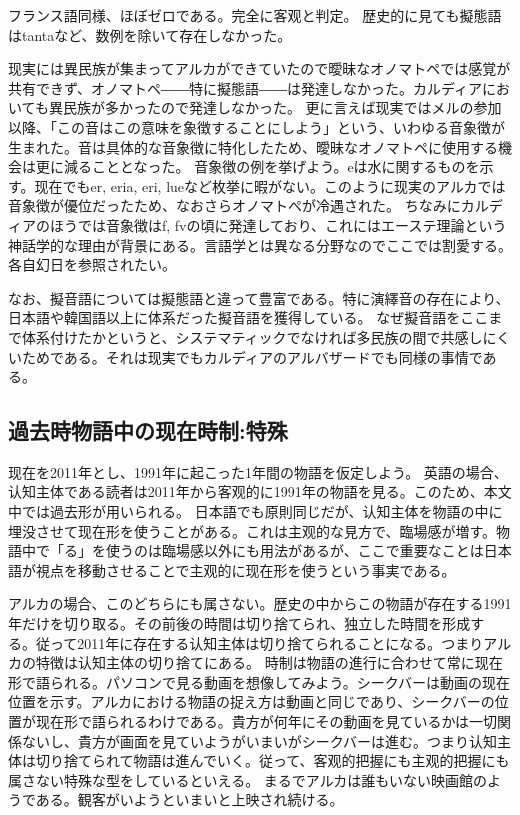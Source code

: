 フランス語同様、ほぼゼロである。完全に客观と判定。
歴史的に見ても擬態語はtantaなど、数例を除いて存在しなかった。

现実には異民族が集まってアルカができていたので曖昧なオノマトペでは感覚が共有できず、オノマトペ――特に擬態語――は発達しなかった。カルディアにおいても異民族が多かったので発達しなかった。
更に言えば现実ではメルの参加以降、「この音はこの意味を象徴することにしよう」という、いわゆる音象徴が生まれた。音は具体的な音象徴に特化したため、曖昧なオノマトペに使用する機会は更に減ることとなった。
音象徴の例を挙げよう。eは水に関するものを示す。现在でもer, eria, eri, lueなど枚挙に暇がない。このように现実のアルカでは音象徴が優位だったため、なおさらオノマトペが冷遇された。
ちなみにカルディアのほうでは音象徴はf, fvの頃に発達しており、これにはエーステ理論という神話学的な理由が背景にある。言語学とは異なる分野なのでここでは割愛する。各自幻日を参照されたい。

なお、擬音語については擬態語と違って豊富である。特に演繹音の存在により、日本語や韓国語以上に体系だった擬音語を獲得している。
なぜ擬音語をここまで体系付けたかというと、システマティックでなければ多民族の間で共感しにくいためである。それは现実でもカルディアのアルバザードでも同様の事情である。

\subsection{過去時物語中の现在時制:特殊}

现在を2011年とし、1991年に起こった1年間の物語を仮定しよう。
英語の場合、认知主体である読者は2011年から客观的に1991年の物語を見る。このため、本文中では過去形が用いられる。
日本語でも原則同じだが、认知主体を物語の中に埋没させて现在形を使うことがある。これは主观的な見方で、臨場感が増す。物語中で「る」を使うのは臨場感以外にも用法があるが、ここで重要なことは日本語が視点を移動させることで主观的に现在形を使うという事実である。

アルカの場合、このどちらにも属さない。歴史の中からこの物語が存在する1991年だけを切り取る。その前後の時間は切り捨てられ、独立した時間を形成する。従って2011年に存在する认知主体は切り捨てられることになる。つまりアルカの特徴は认知主体の切り捨てにある。
時制は物語の進行に合わせて常に现在形で語られる。パソコンで見る動画を想像してみよう。シークバーは動画の现在位置を示す。アルカにおける物語の捉え方は動画と同じであり、シークバーの位置が现在形で語られるわけである。貴方が何年にその動画を見ているかは一切関係ないし、貴方が画面を見ていようがいまいがシークバーは進む。つまり认知主体は切り捨てられて物語は進んでいく。従って、客观的把握にも主观的把握にも属さない特殊な型をしているといえる。
まるでアルカは誰もいない映画館のようである。観客がいようといまいと上映され続ける。


